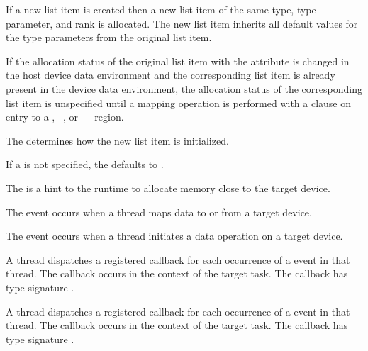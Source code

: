 \begin{fortranspecific}
If a new list item is created then a new list item of the same type, type parameter, and
rank is allocated.  The new list item inherits all default values for
the type parameters from the original list item.

If the allocation status of the original list item with the
 attribute is changed in the host device data
environment and the corresponding list item is already present in the
device data environment, the allocation status of the corresponding
list item is unspecified until a mapping operation is performed with a
 clause on entry to a , ~, or
~~ region.
\end{fortranspecific}

The  determines how the new list item is initialized.

If a  is not specified, the  defaults to .

The   is a hint to the runtime to allocate memory close to the target device.

\events
The  event occurs when a thread maps data to or from a target device.

The  event occurs when a thread initiates a data operation on a target device.

\tools

A thread dispatches a registered 
callback for each occurrence of a  event in that thread.
The callback occurs in the context of the target task.  The callback has type signature
.

A thread dispatches a registered 
callback for each occurrence of a  event in that thread.
The callback occurs in the context of the target task.  The callback has type signature
.

